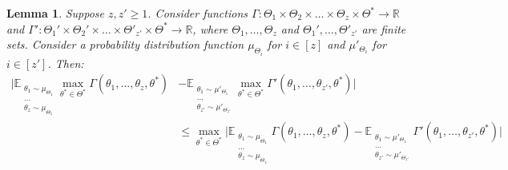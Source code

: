 \documentclass{article}
\newcommand\R{\mathbb{R}}
\theoremstyle{plain}
\newtheorem{lemma}[theorem]{Lemma}
\theoremstyle{definition}
\def\E{\mathbb{E}}
\begin{document}
\begin{lemma} Suppose $z, z'\geq 1$. Consider functions $\Gamma:\Theta_1\times \Theta_2\times \dots\times \Theta_z \times \Theta^* \to \R$ and $\Gamma':\Theta_1'\times \Theta_2'\times \dots\times \Theta'_{z'} \times \Theta^* \to \R$, where $\Theta_1,\dots,\Theta_z$ and $\Theta_1',\dots,\Theta'_{z'}$ are finite sets. Consider a probability distribution function $\mu_{\Theta_i}$ for $i\in[z]$ and $\mu'_{\Theta_i}$ for $i\in[z']$. Then:
\begin{align*}\bigg|\E_{\substack{\theta_1\sim \mu_{\Theta_1} \\ \dots \\ \theta_z\sim\mu_{\Theta_z}}} \max_{\theta^*\in\Theta^*} \Gamma(\theta_1,\dots,\theta_z,\theta^*) &- \E_{\substack{\theta_1\sim \mu'_{\Theta_1}\\ \dots\\ \theta_{z'}\sim\mu'_{\Theta_{z'}}}}\max_{{\theta}^{*}\in\Theta^*} \Gamma'(\theta_1,\dots,\theta_{z'},\theta^*)\bigg| \\
&\leq \max_
{\theta^*\in\Theta^*}\bigg|\E_{\substack{\theta_1\sim \mu_{\Theta_1} \\ \dots \\ \theta_z\sim\mu_{\Theta_z}}}\Gamma(\theta_1,\dots,\theta_z,\theta^*) - \E_{\substack{\theta_1\sim \mu'_{\Theta_1} \\ \dots \\ \theta_{z'}\sim\mu'_{\Theta_{z'}}}}\Gamma'(\theta_1,\dots,\theta_{z'},\theta^*)\bigg|\end{align*}
\end{lemma}
\end{document}
